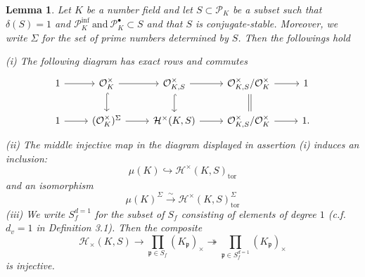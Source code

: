 \documentclass{article}
\theoremstyle{plain}
\newtheorem{lem}[thm]{Lemma}
\theoremstyle{definition}
\theoremstyle{remark}
\begin{document}
\begin{lem}
Let $K$ be a number field and let $S \subset \mathscr{P}_K$ be a subset such that $\delta(S) = 1$ and $\mathscr{P}_K^{\text{inf}} ~\text{and}~\mathscr{P}_K^{\bullet}\subset S$ and that $S$ is conjugate-stable. Moreover, we write $\Sigma$ for the set of prime numbers determined by $S$. Then the followings hold \par 
(i) The following diagram has exact rows and commutes
$$
\begin{tikzcd}
	1 & {\mathcal{O}_K^{\times}} & {\mathcal{O}_{K,S}^{\times}} & {\mathcal{O}_{K,S}^{\times}/\mathcal{O}_{K}^{\times}} & 1 \\
	1 & {(\mathcal{O}_K^{\times})^{\Sigma}} & {\mathcal{H}^{\times}(K,S)} & {\mathcal{O}_{K,S}^{\times}/\mathcal{O}_K^{\times}} & 1.
	\arrow[from=1-1, to=1-2]
	\arrow[from=1-2, to=1-3]
	\arrow[hook, from=1-2, to=2-2]
	\arrow[from=1-3, to=1-4]
	\arrow[hook, from=1-3, to=2-3]
	\arrow[from=1-4, to=1-5]
	\arrow[no head, from=1-4, to=2-4]
	\arrow[shift left, no head, from=1-4, to=2-4]
	\arrow[from=2-1, to=2-2]
	\arrow[from=2-2, to=2-3]
	\arrow[from=2-3, to=2-4]
	\arrow[from=2-4, to=2-5]
\end{tikzcd}
$$
(ii) The middle injective map in the diagram displayed in assertion (i) induces an inclusion:
$$
\mu(K) \hookrightarrow \mathcal{H}^{\times}(K,S)_{\text{tor}}
$$
and an isomorphism
$$\mu(K)^{\Sigma} \xrightarrow{\sim} \mathcal{H}^{\times}(K,S)_{\text{tor}}^{\Sigma}$$
(iii) We write $S_f^{d=1}$ for the subset of $S_f$ consisting of elements of degree $1$ (c.f. $d_v = 1$ in Definition 3.1). Then the composite
$$
\mathcal{H}_{\times}(K,S) \to \prod_{\mathfrak{p} \in S_f} (K_{\mathfrak{p}})_{\times} \twoheadrightarrow \prod_{\mathfrak{p} \in S_f^{d=1}} (K_{\mathfrak{p}})_{\times}
$$
is injective.
\end{lem}
\end{document}
